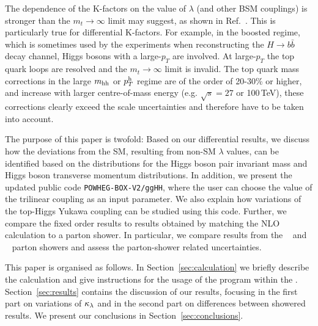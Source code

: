 The dependence of the K-factors on the value of $\lambda$ (and other BSM couplings) is stronger than the $m_t\to\infty$ limit may suggest, as shown in Ref.~\cite{Buchalla:2018yce}. This is particularly true for differential K-factors. For example, in the boosted regime, which is sometimes used by the experiments when reconstructing the $H \rightarrow b\bar{b}$ decay channel, Higgs bosons with a large-$p_T$ are involved. At large-$p_T$ the top quark loops are resolved and the $m_t\to\infty$ limit is invalid.
The top quark mass corrections in the large $m_{\mathrm{hh}}$ or $p_T^{\mathrm{h}}$ regime are of the order of 20-30\% or higher, and increase with larger centre-of-mass energy (e.g. $\sqrt{s}=27$ or 100\,TeV), these corrections clearly exceed the scale uncertainties and therefore have to be taken into account.

The purpose of this paper is twofold: Based on our differential results, we discuss how the deviations from the SM, resulting from non-SM $\lambda$ values, can be identified based on the distributions for the Higgs boson pair invariant mass and Higgs boson transverse momentum distributions. 
In addition, we present the updated public code {\tt POWHEG-BOX-V2/ggHH}, where the user can choose the value of the trilinear coupling as an input parameter.
We also explain how variations of the top-Higgs Yukawa coupling can be studied using this code.
Further, we compare the fixed order results to results obtained by matching the NLO calculation to a parton shower. In particular, we compare results from the \pythia~\cite{Sjostrand:2014zea} and \herwig~\cite{Bellm:2017bvx} parton showers and assess the parton-shower related uncertainties.

This paper is organised as follows. In Section~\ref{sec:calculation} we briefly describe the calculation and give instructions for the usage of the program within the \powhegbox. Section~\ref{sec:results} contains the discussion of our results, focusing in the first part on variations of $\kappa_{\lambda}$ and in the second part on differences between showered results. We present our conclusions in Section~\ref{sec:conclusions}.
